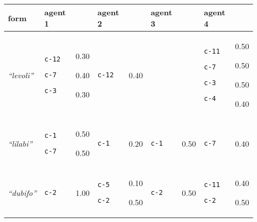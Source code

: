 
{\footnotesize\renewcommand{\arraystretch}{1.5}
\begin{tabular}{@{}p{1.2cm}|p{1.6cm}@{}p{0.8cm}@{}|p{1.6cm}@{}p{0.8cm}@{}|p{1.6cm}@{}p{0.8cm}@{}|p{1.6cm}@{}p{0.8cm}@{}}
form & agent 1 &  & agent 2 &  & agent 3 &  & agent 4 & \\
\hline
\textit{``levoli''}&\texttt{c-12}


\texttt{c-7}


\texttt{c-3}
&0.30

0.40

0.30&\texttt{c-12}
&0.40&&&\texttt{c-11}


\texttt{c-7}


\texttt{c-3}


\texttt{c-4}
&0.50

0.50

0.50

0.40\\
\hline
\textit{``lilabi''}&\texttt{c-1}


\texttt{c-7}
&0.50

0.50&\texttt{c-1}
&0.20&\texttt{c-1}
&0.50&\texttt{c-7}
&0.40\\
\hline
\textit{``dubifo''}&\texttt{c-2}
&1.00&\texttt{c-5}


\texttt{c-2}
&0.10

0.50&\texttt{c-2}
&0.50&\texttt{c-11}


\texttt{c-2}
&0.40

0.50\\
\end{tabular}}


